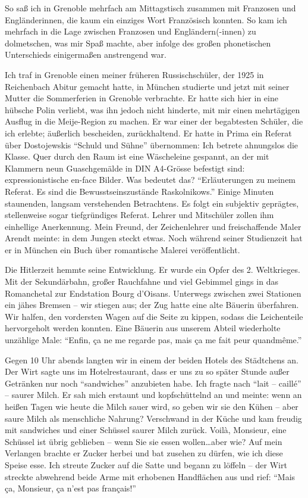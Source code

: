 \documentclass[a5paper,pagesize,10pt,twoside=true]{scrbook}
\begin{document}
So saß ich in Grenoble mehrfach am Mittagstisch zusammen mit Franzosen und Engländerinnen, die kaum ein einziges Wort Französisch konnten. So kam ich mehrfach in die Lage zwischen Franzosen und Engländern(-innen) zu dolmetschen, was mir Spaß machte, aber infolge des großen phonetischen Unterschieds einigermaßen anstrengend war.

Ich traf in Grenoble einen meiner früheren Russischschüler, der 1925 in Reichenbach Abitur gemacht hatte, in München studierte und jetzt mit seiner Mutter die Sommerferien in Grenoble verbrachte. Er hatte sich hier in eine hübsche Polin verliebt, was ihn jedoch nicht hinderte, mit mir einen mehrtägigen Ausflug in die Meije-Region zu machen. Er war einer der begabtesten Schüler, die ich erlebte; äußerlich bescheiden, zurückhaltend. Er hatte in Prima ein Referat über Dostojewskis \enquote{Schuld und Sühne} übernommen: Ich betrete ahnungslos die Klasse. Quer durch den Raum ist eine Wäscheleine gespannt, an der mit Klammern neun Guaschgemälde in DIN A4-Grösse befestigt sind: expressionistische en-face Bilder. Was bedeutet das? \enquote{Erläuterungen zu meinem Referat. Es sind die Bewusstseinszustände Raskolnikows.} Einige Minuten staunenden, langsam verstehenden Betrachtens. Es folgt ein subjektiv geprägtes, stellenweise sogar tiefgründiges Referat. Lehrer und Mitschüler zollen ihm einhellige Anerkennung. Mein Freund, der Zeichenlehrer und freischaffende Maler Arendt meinte: in dem Jungen steckt etwas. Noch während seiner Studienzeit hat er in München ein Buch über romantische Malerei veröffentlicht.

Die Hitlerzeit hemmte seine Entwicklung. Er wurde ein Opfer des 2. Weltkrieges.\\

Mit der Sekundärbahn, großer Rauchfahne und viel Gebimmel gings in das Romanchetal zur Endstation Bourg d'Oisans. Unterwegs zwischen zwei Stationen ein jähes Bremsen -- wir stiegen aus; der Zug hatte eine alte Bäuerin überfahren. Wir halfen, den vordersten Wagen auf die Seite zu kippen, sodass die Leichenteile hervorgeholt werden konnten. Eine Bäuerin aus unserem Abteil wiederholte unzählige Male: \enquote{Enfin, ça ne me regarde pas, mais ça me fait peur quandmême.}

Gegen 10 Uhr abends langten wir in einem der beiden Hotels des Städtchens an. Der Wirt sagte uns im Hotelrestaurant, dass er uns zu so später Stunde außer Getränken nur noch \enquote{sandwiches} anzubieten habe. Ich fragte nach \enquote{lait -- caillé} -- saurer Milch. Er sah mich erstaunt und kopfschüttelnd an und meinte: wenn an heißen Tagen wie heute die Milch sauer wird, so geben wir sie den Kühen -- aber saure Milch als menschliche Nahrung? Verschwand in der Küche und kam freudig mit sandwiches und einer Schüssel saurer Milch zurück. Voilà, Monsieur, eine Schüssel ist übrig geblieben -- wenn Sie sie essen wollen\dots aber wie? Auf mein Verlangen brachte er Zucker herbei und bat zusehen zu dürfen, wie ich diese Speise esse. Ich streute Zucker auf die Satte und begann zu löffeln -- der Wirt streckte abwehrend beide Arme mit erhobenen Handflächen aus und rief: \enquote{Mais ça, Monsieur, ça n'est pas français!}
\end{document}
